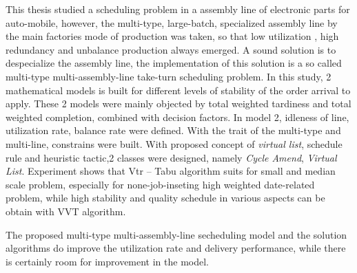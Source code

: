 This thesis studied a scheduling problem in a assembly line of electronic parts for auto-mobile, however, the multi-type, large-batch, specialized assembly line by the main factories mode of production was taken, so that low utilization , high redundancy and unbalance production always emerged. A sound solution is to despecialize the assembly line, the implementation of this solution is a so called multi-type multi-assembly-line take-turn scheduling problem. In this study, 2 mathematical models is built for different levels of stability of the order arrival to apply. 
These 2 models were mainly objected by total weighted tardiness and total weighted completion, combined with decision factors. In model 2, idleness of line, utilization rate, balance rate were defined.
With the trait of the multi-type and multi-line, constrains were built.
With proposed concept of \textit{virtual list}, 
schedule rule and heuristic tactic,2 classes were designed, namely \textit{Cycle Amend}, \textit{Virtual List}. 
Experiment shows that Vtr -- Tabu algorithm suits for small and median scale problem, especially for none-job-inseting high weighted date-related problem, while high stability and quality schedule in various aspects can be obtain with VVT algorithm.

The proposed multi-type multi-assembly-line secheduling model and the solution algorithms do improve the utilization rate and delivery performance, while there is certainly room for improvement in the model.

